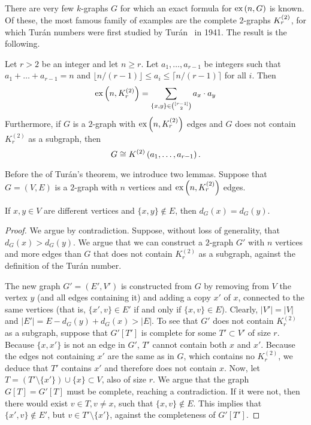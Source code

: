 There are very few $k$-graphs $G$ for which an exact formula for $\text{ex} \left( n, G \right)$ is known.
Of these, the most famous family of examples are the complete $2$-graphs $K^{(2)}_{r}$,
for which Turán numbers were first studied by Turán~\cite{Turan1941} in 1941.
The result is the following.

\begin{theorem}
    \label{thm:turan}
    Let $r > 2$ be an integer and let $n \geq r$.
    Let $a_1, \dots, a_{r-1}$ be integers such that $a_1 + \dots + a_{r-1} = n$
    and $\lfloor n / (r-1) \rfloor \leq a_i \leq \lceil n / (r-1) \rceil$ for all $i$.
    Then
    \begin{equation} \label{eq:turan}
        \text{ex} \left( n, K^{(2)}_{r} \right) = \sum_{\{x, y\} \in \binom{[r-1]}{2}} a_x \cdot a_y
    \end{equation}
    Furthermore, if $G$ is a $2$-graph with $\text{ex} \left( n, K^{(2)}_{r} \right)$ edges
    and $G$ does not contain $K_r^{(2)}$ as a subgraph, then
    \[
        G\cong K^{(2)}\left(a_1, \dots, a_{r-1}\right).
    \]

\end{theorem}

Before the  of Turán's theorem, we introduce two lemmas.
Suppose that $G = (V, E)$ is a $2$-graph with $n$ vertices and
$\text{ex} \left( n, K^{(2)}_{r} \right)$ edges.

\begin{lemma}\label{lem:same_degree}
    If $x, y \in V$ are different vertices and $\{x, y\} \notin E$, then $d_G(x) = d_G(y)$.
    \begin{proof}
        We argue by contradiction.
        Suppose, without loss of generality, that $d_G(x) > d_G(y)$.
        We argue that we can construct a $2$-graph $G'$ with $n$ vertices
        and more edges than $G$ that does not contain $K_r^{(2)}$ as a subgraph, against the definition of
        the Turán number.

        The new graph $G' = (E', V')$ is constructed from $G$ by removing from $V$ the vertex $y$
        (and all edges containing it)
        and adding a copy $x'$ of $x$, connected to the same vertices (that is, $\{x', v\} \in E'$
        if and only if $\{x, v\} \in E$).
        Clearly, $|V'| = |V|$ and $|E'| = E - d_G(y) + d_G(x) > |E|$.
        To see that $G'$ does not contain $K_r^{(2)}$ as a subgraph,
        suppose that $G'[T']$ is complete for some $T' \subset V'$ of size $r$.
        Because $\{x, x'\}$ is not an edge in $G'$, $T'$ cannot contain both $x$ and $x'$.
        Because the edges not containing $x'$ are the same as in $G$, which contains no $K_r^{(2)}$,
        we deduce that $T'$ contains $x'$ and therefore does not contain $x$.
        Now, let $T = (T' \setminus \{x'\}) \cup \{x\} \subset V$, also of size $r$.
        We argue that the graph $G[T] = G'[T]$ must be complete, reaching a contradiction.
        If it were not, then there would exist $v \in T, v \neq x$, such that $\{x, v\} \notin E$.
        This implies that $\{x', v\} \notin E'$, but $v \in T' \setminus \{x'\}$,
        against the completeness of $G'[T']$.
    \end{proof}
\end{lemma}

